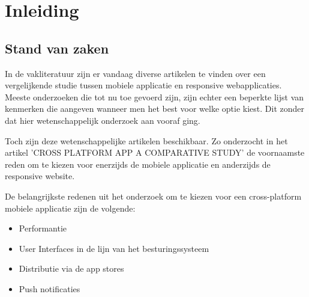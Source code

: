 

\chapter{Inleiding}
\label{ch:inleiding}



\section{Stand van zaken}
\label{sec:stand-van-zaken}

In de vakliteratuur zijn er vandaag diverse artikelen te vinden over een vergelijkende studie tussen mobiele applicatie
en responsive webapplicaties. Meeste onderzoeken die tot nu toe gevoerd zijn, zijn echter een beperkte lijst van kenmerken die aangeven wanneer men het best voor welke optie kiest.
Dit zonder dat hier wetenschappelijk onderzoek aan vooraf ging.

Toch zijn deze wetenschappelijke artikelen beschikbaar. Zo onderzocht \cite{albuquerque2015}
in het artikel 'CROSS PLATFORM APP A COMPARATIVE STUDY' de voornaamste reden om te kiezen voor enerzijds de mobiele
applicatie en anderzijds de responsive website.

De belangrijkste redenen uit het onderzoek om te kiezen voor een cross-platform mobiele applicatie zijn de volgende:
\begin{itemize}
  \item{Performantie}
  \item{User Interfaces in de lijn van het besturingssysteem}
  \item{Distributie via de app stores}
  \item{Push notificaties}
\end{itemize}


